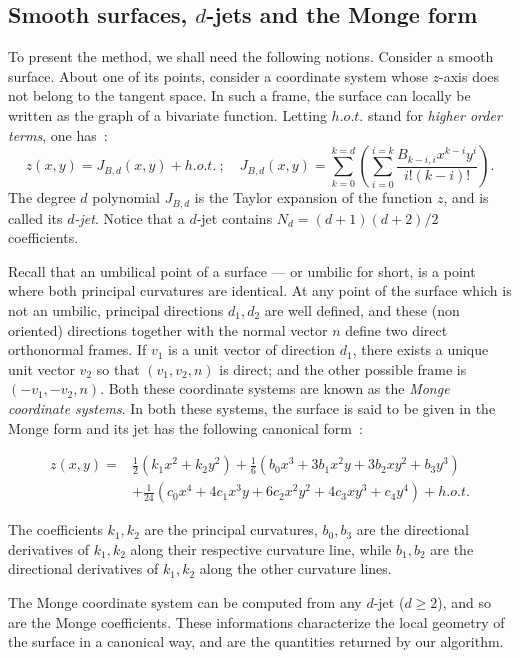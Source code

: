 \subsection{Smooth surfaces, $d$-jets and the Monge form}

To present the method, we shall need the following notions. Consider a
smooth surface.  About one of its points, consider a coordinate system
whose $z$-axis does not belong to the tangent space. In such a frame,
the surface can locally be written as the graph of a bivariate
function. Letting $h.o.t.$ stand for {\em higher order terms}, one
has~:
%
\begin{equation}
z(x,y)=J_{B,d}(x,y) + h.o.t. \ ; \quad 
J_{B,d}(x,y)=\sum_{k=0}^{k=d}(\sum_{i=0}^{i=k}
\frac{B_{k-i,i}x^{k-i}y^{i}}{i!(k-i)!}).
\end{equation}
The degree $d$ polynomial $J_{B,d}$ is the Taylor expansion of the
function $z$, and is called its {\em $d$-jet}. Notice that a $d$-jet contains
$N_d=(d+1)(d+2)/2$ coefficients.

Recall that an umbilical point of a surface --- or umbilic for short,
is a point where both principal curvatures are identical.  At any
point of the surface which is not an umbilic, principal directions
$d_1, d_2$ are well defined, and these (non oriented) directions
together with the normal vector $n$ define two direct orthonormal
frames. If $v_1$ is a unit vector of direction $d_1$, there exists a
unique unit vector $v_2$ so that $(v_1,v_2,n)$ is direct; and the
other possible frame is $(-v_1,-v_2,n)$.  Both these coordinate
systems are known as the {\em Monge coordinate systems}. In both these
systems, the surface is said to be given in the Monge form and its jet
has the following canonical form~:

\begin{eqnarray}
\label{eq:monge}
z(x,y) =  & \frac{1}{2}(k_1x^2 + k_2y^2)+
	\frac{1}{6}(b_0x^3+3b_1x^2y+3b_2xy^2+b_3y^3) \\
  &  +\frac{1}{24}(c_0x^4+4c_1x^3y+6c_2x^2y^2+4c_3xy^3+c_4y^4) + h.o.t.
\end{eqnarray}

The coefficients $k_1, k_2$ are the principal curvatures,
$b_0,b_3$ are the directional derivatives of $k_1,k_2$ along their
respective curvature line, while $b_1,b_2$ are the directional
derivatives of $k_1,k_2$ along the other curvature lines.

The Monge coordinate system can be computed from any $d$-jet ($d\geq
2$), and so are the Monge coefficients. These informations
characterize the local geometry of the surface in a canonical way, and
are the quantities returned by our algorithm.



